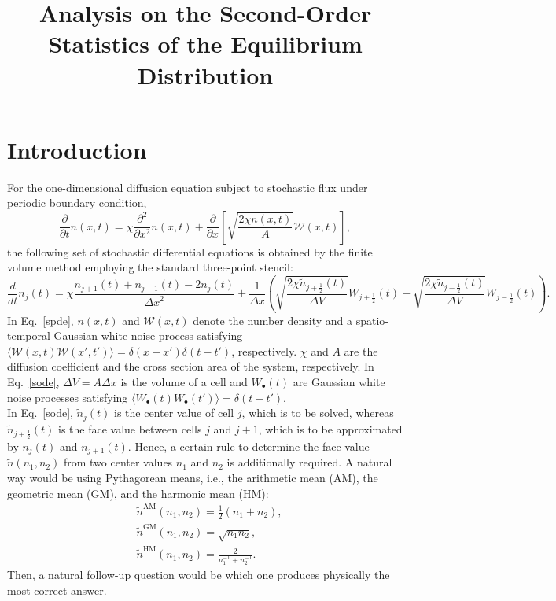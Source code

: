\documentclass{article}
\newcommand{\dx}{{\Delta x}}
\newcommand{\dV}{{\Delta V}}
\begin{document}
\title{Analysis on the Second-Order Statistics of the Equilibrium Distribution}
\date{}
\author{}
\maketitle

\section{Introduction}

For the one-dimensional diffusion equation subject to stochastic flux under periodic boundary condition,
\begin{equation}
\label{spde}
\frac{\partial}{\partial t}n(x,t)
=\chi\frac{\partial^2}{\partial x^2}n(x,t)
+\frac{\partial}{\partial x}\left[
\sqrt{\frac{2\chi n(x,t)}{A}}\bm{\mathcal{W}}(x,t)
\right],
\end{equation}
the following set of stochastic differential equations is obtained by the finite volume method employing the standard three-point stencil:
\begin{equation}
\label{sode}
\frac{d}{dt}n_j(t)=\chi\frac{n_{j+1}(t)+n_{j-1}(t)-2n_j(t)}{\dx^2}
+\frac{1}{\dx}\left(
\sqrt{\frac{2\chi\tilde{n}_{j+\frac12}(t)}{\dV}}W_{j+\frac12}(t)
-\sqrt{\frac{2\chi\tilde{n}_{j-\frac12}(t)}{\dV}}W_{j-\frac12}(t)
\right).
\end{equation}
In Eq.~\eqref{spde}, $n(x,t)$ and $\bm{\mathcal{W}}(x,t)$ denote the number density and a spatio-temporal Gaussian white noise process satisfying $\langle\bm{\mathcal{W}}(x,t)\bm{\mathcal{W}}(x',t')\rangle =\delta(x-x')\delta(t-t')$, respectively.  
$\chi$ and $A$ are the diffusion coefficient and the cross section area of the system, respectively.
In Eq.~\eqref{sode}, $\dV=A\dx$ is the volume of a cell and $W_\bullet(t)$ are Gaussian white noise processes satisfying $\langle W_\bullet(t)W_\bullet(t')\rangle=\delta(t-t')$.
\\

In Eq.~\eqref{sode}, $\tilde{n}_j(t)$ is the center value of cell $j$, which is to be solved, whereas $\tilde{n}_{j+\frac12}(t)$ is the face value between cells $j$ and $j+1$, which is to be approximated by $n_j(t)$ and $n_{j+1}(t)$.
Hence, a certain rule to determine the face value $\tilde{n}(n_1,n_2)$ from two center values $n_1$ and $n_2$ is additionally required.
A natural way would be using Pythagorean means, i.e., the arithmetic mean (AM), the geometric mean (GM), and the harmonic mean (HM):
\begin{align}
&\tilde{n}^\mathrm{AM}(n_1,n_2)=\frac12(n_1+n_2),\\
&\tilde{n}^\mathrm{GM}(n_1,n_2)=\sqrt{n_1 n_2},\\
&\tilde{n}^\mathrm{HM}(n_1,n_2)=\frac{2}{n_1^{-1}+n_2^{-1}}.
\end{align} 
Then, a natural follow-up question would be which one produces physically the most correct answer.
\\
\end{document}
